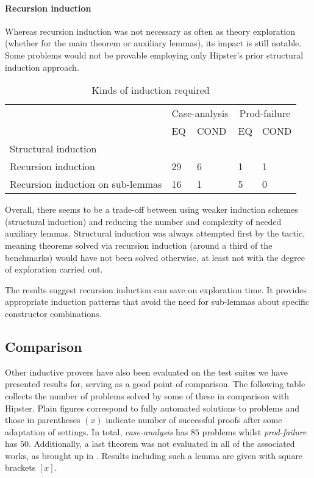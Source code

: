 \paragraph{Recursion induction}

Whereas recursion induction was not necessary as often as theory exploration (whether for the main theorem or auxiliary lemmas), its impact is still notable.
%
Some problems would not be provable employing only Hipster's prior structural induction approach.

\noindent \begin{table}[h]
\begin{tabularx}{\textwidth}{l | X X | X X}
  & \multicolumn{2}{c|}{Case-analysis} & \multicolumn{2}{c}{Prod-failure} \\
  &  EQ & COND & EQ & COND \\
  \hline
  Structural induction & & & \\
  Recursion induction & 29 & 6 & 1 & 1 \\
  Recursion induction on sub-lemmas & 16 & 1 & 5 & 0 \\
\end{tabularx}
\caption{Kinds of induction required}
\label{tab:rec-ind}
\end{table}

Overall, there seems to be a trade-off between using weaker induction schemes (structural induction) and reducing the number and complexity of needed auxiliary lemmas.
%
Structural induction was always attempted first by the tactic, meaning theorems solved via recursion induction (around a third of the benchmarks) would have not been solved otherwise, at least not with the degree of exploration carried out.
 
The results suggest recursion induction can save on exploration time.
%
It provides appropriate induction patterns that avoid the need for sub-lemmas about specific constructor combinations.


\subsection{Comparison}


Other inductive provers have also been evaluated on the test suites we have presented results for, serving as a good point of comparison.
%
The following table collects the number of problems solved by some of these in comparison with Hipster.
%
Plain figures correspond to fully automated solutions to problems and those in parentheses $(x)$ indicate number of successful proofs after some adaptation of settings.
%
In total, \emph{case-analysis} has $85$ problems whilst \emph{prod-failure} has $50$.
%
Additionally, a last theorem was not evaluated in all of the associated works, as brought up in \cite{SPASSInduction}. Results including such a lemma are given with square brackets $[x]$.

